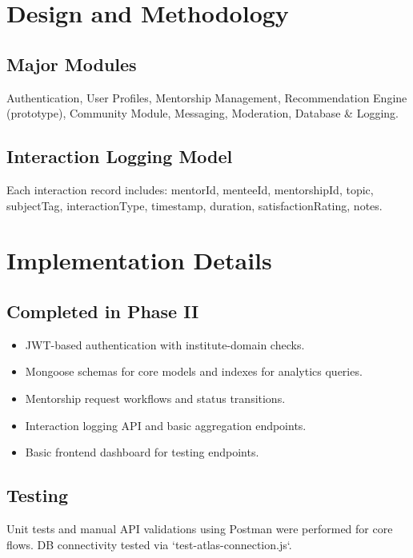 \documentclass[12pt,singleside,a4paper]{article}
\begin{document}
\newpage

\section{Design and Methodology}
\subsection{Major Modules}
Authentication, User Profiles, Mentorship Management, Recommendation Engine (prototype), Community Module, Messaging, Moderation, Database & Logging.

\subsection{Interaction Logging Model}
Each interaction record includes: mentorId, menteeId, mentorshipId, topic, subjectTag, interactionType, timestamp, duration, satisfactionRating, notes.

\newpage

\section{Implementation Details}
\subsection{Completed in Phase II}
\begin{itemize}
  \item JWT-based authentication with institute-domain checks.
  \item Mongoose schemas for core models and indexes for analytics queries.
  \item Mentorship request workflows and status transitions.
  \item Interaction logging API and basic aggregation endpoints.
  \item Basic frontend dashboard for testing endpoints.
\end{itemize}

\subsection{Testing}
Unit tests and manual API validations using Postman were performed for core flows. DB connectivity tested via `test-atlas-connection.js`.

\newpage

\end{document}
